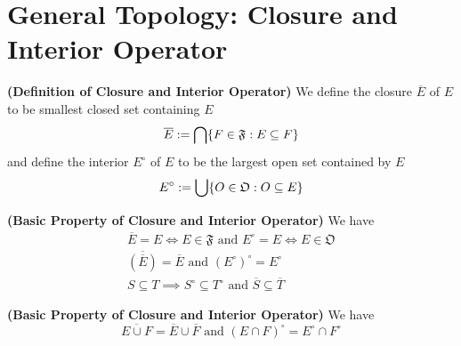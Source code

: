 \documentclass{report}
\begin{document}
\section{General Topology: Closure and Interior Operator}
\begin{definition}
\label{2.2.1}
\textbf{(Definition of Closure and Interior Operator)} We define the closure $\overline{E}$ of $E$ to be smallest closed set containing $E$
\begin{equation}
  \overline{E}:=\bigcap \{ F\in\mathfrak{F}:E\subseteq F \}
\end{equation}
and define the interior $E^\circ$ of  $E$ to be the largest open set contained by  $E$ 
\begin{equation}
E^\circ :=\bigcup  \{ O\in\mathfrak{O}:O \subseteq E \}
\end{equation}
\end{definition}
\begin{theorem}
\label{2.2.2}
\textbf{(Basic Property of Closure and Interior Operator)} We have
\begin{gather}
  \overline{E}=E\iff E\in\mathfrak{F}\text{ and }E^\circ=E\iff E\in\mathfrak{O}\\
\overline{(\overline{E})}=\overline{E}\text{ and }(E^\circ)^\circ=E^\circ\\
  S\subseteq T \implies S^\circ \subseteq T^\circ\text{ and }\overline{S}\subseteq \overline{T}
\end{gather}
\end{theorem}
\begin{theorem}
\label{2.2.3}
\textbf{(Basic Property of Closure and Interior Operator)} We have 
\begin{equation}
   \overline{E\cup F}=\overline{E}\cup \overline{F}\text{ and }(E\cap F)^\circ=E^\circ \cap F^\circ
\end{equation}
\end{theorem}
\end{document}
